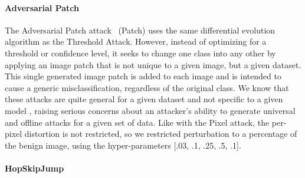 \documentclass[lettersize,journal]{IEEEtran}
\begin{document}
\paragraph{Adversarial Patch}

The Adversarial Patch attack~\cite{adversarialpatch} (Patch) uses the same differential evolution algorithm as the Threshold Attack. However, instead of optimizing for a threshold or confidence level, it seeks to change one class into any other by applying an image patch that is not unique to a given image, but a given dataset. This single generated image patch is added to each image and is intended to cause a generic misclassification, regardless of the original class.  We know that these attacks are quite general for a given dataset and not specific to a given model \cite{adversarialpatch, xiao2021improving}, raising serious concerns about an attacker's ability to generate universal and offline attacks for a given set of data. Like with the Pixel attack, the per-pixel distortion is not restricted, so we restricted perturbation to a percentage of the benign image, using the hyper-parameters [.03, .1, .25, .5, .1]. 



\paragraph{HopSkipJump}
\end{document}

